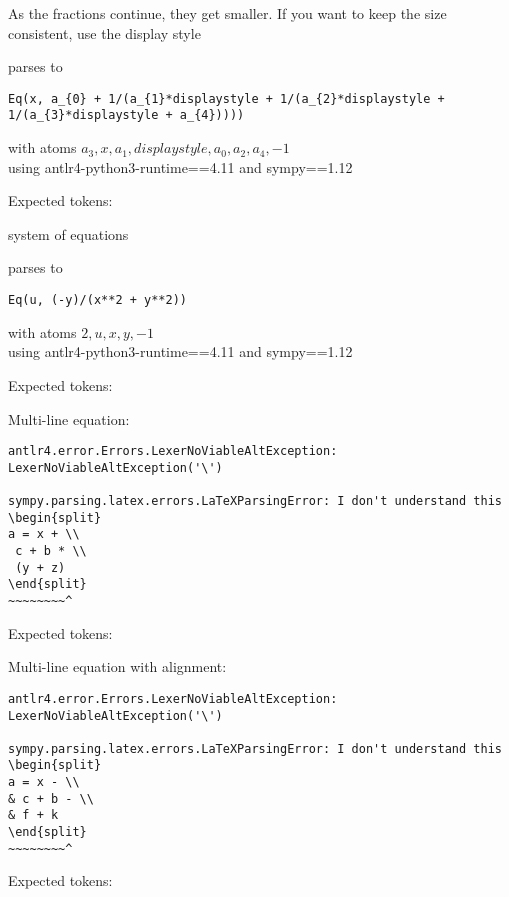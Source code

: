 \documentclass{article}
\begin{document}
\hrulefill

As the fractions continue, they get smaller. If you want to keep the size consistent, use the display style

parses to
\begin{verbatim}
Eq(x, a_{0} + 1/(a_{1}*displaystyle + 1/(a_{2}*displaystyle + 1/(a_{3}*displaystyle + a_{4}))))
\end{verbatim}
with atoms ${a_{3}, x, a_{1}, displaystyle, a_{0}, a_{2}, a_{4}, -1}$\\
using antlr4-python3-runtime==4.11 and sympy==1.12

Expected tokens: 

\hrulefill

system of equations

parses to
\begin{verbatim}
Eq(u, (-y)/(x**2 + y**2))
\end{verbatim}
with atoms ${2, u, x, y, -1}$\\
using antlr4-python3-runtime==4.11 and sympy==1.12

Expected tokens: 

\hrulefill

Multi-line equation:

\begin{verbatim}
antlr4.error.Errors.LexerNoViableAltException: LexerNoViableAltException('\')

sympy.parsing.latex.errors.LaTeXParsingError: I don't understand this
\begin{split}
a = x + \\
 c + b * \\
 (y + z)
\end{split}
~~~~~~~~^
\end{verbatim}

Expected tokens: 

\hrulefill

Multi-line equation with alignment:

\begin{verbatim}
antlr4.error.Errors.LexerNoViableAltException: LexerNoViableAltException('\')

sympy.parsing.latex.errors.LaTeXParsingError: I don't understand this
\begin{split}
a = x - \\
& c + b - \\
& f + k
\end{split}
~~~~~~~~^
\end{verbatim}

Expected tokens: 

\hrulefill
\end{document}
